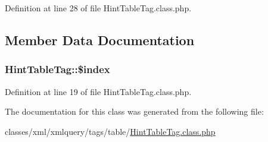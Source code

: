 Definition at line 28 of file Hint\+Table\+Tag.\+class.\+php.



\subsection{Member Data Documentation}
\hypertarget{classHintTableTag_aaed2fb461aff0380f77a16df5d04298c}{}
\subsubsection[{\$index}]{\setlength{\rightskip}{0pt plus 5cm}Hint\+Table\+Tag\+::\$index}\label{classHintTableTag_aaed2fb461aff0380f77a16df5d04298c}


Definition at line 19 of file Hint\+Table\+Tag.\+class.\+php.



The documentation for this class was generated from the following file\+:\begin{DoxyCompactItemize}
\item 
classes/xml/xmlquery/tags/table/\hyperlink{HintTableTag_8class_8php}{Hint\+Table\+Tag.\+class.\+php}\end{DoxyCompactItemize}
